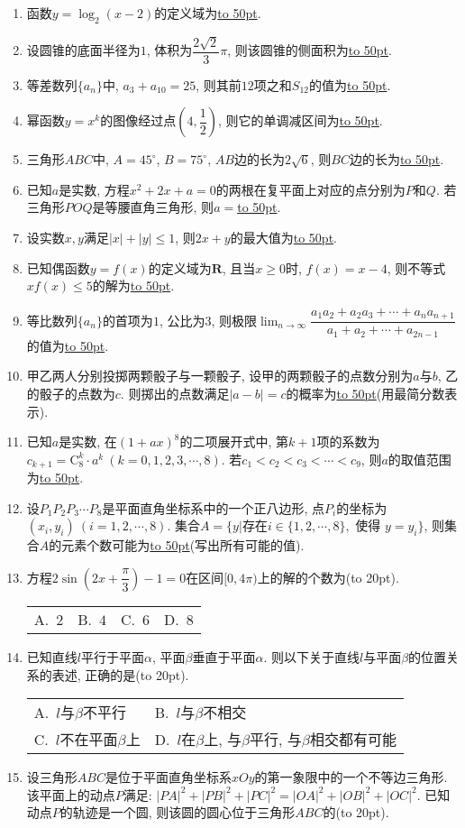 \documentclass[10pt,a4paper]{article}
\newcommand{\blank}[1]{\underline{\hbox to #1pt{}}}
\newcommand{\bracket}[1]{(\hbox to #1pt{})}
\newcommand{\twoch}[4]{\par\begin{tabular}{p{.46\textwidth}p{.46\textwidth}}
A.~#1& B.~#2\\
C.~#3& D.~#4
\end{tabular}}
\newcommand{\fourch}[4]{\par\begin{tabular}{p{.23\textwidth}p{.23\textwidth}p{.23\textwidth}p{.23\textwidth}}
A.~#1 &B.~#2& C.~#3& D.~#4
\end{tabular}}
\begin{document}
\begin{enumerate}[1.]
\item 函数$y=\log_2(x-2)$的定义域为\blank{50}.
\item 设圆锥的底面半径为$1$, 体积为$\dfrac{2\sqrt 2}3\pi$, 则该圆锥的侧面积为\blank{50}.
\item 等差数列$\{a_n\}$中, $a_3+a_{10}=25$, 则其前$12$项之和$S_{12}$的值为\blank{50}.
\item 幂函数$y=x^k$的图像经过点$(4,\dfrac 12)$, 则它的单调减区间为\blank{50}.
\item 三角形$ABC$中, $A=45^\circ$, $B=75^\circ$, $AB$边的长为$2\sqrt 6$, 则$BC$边的长为\blank{50}.
\item 已知$a$是实数, 方程$x^2+2x+a=0$的两根在复平面上对应的点分别为$P$和$Q$. 若三角形$POQ$是等腰直角三角形, 则$a=$\blank{50}.
\item 设实数$x,y$满足$|x|+|y|\le 1$, 则$2x+y$的最大值为\blank{50}.
\item 已知偶函数$y=f(x)$的定义域为$\mathbf{R}$, 且当$x\ge 0$时, $f(x)=x-4$, 则不等式$xf(x)\le 5$的解为\blank{50}.
\item 等比数列$\{a_n\}$的首项为$1$, 公比为$3$, 则极限$\lim_{n\to \infty}\dfrac{a_1a_2+a_2a_3+\cdots+a_na_{n+1}}{a_1+a_2+\cdots+a_{2n-1}}$的值为\blank{50}.
\item 甲乙两人分别投掷两颗骰子与一颗骰子, 设甲的两颗骰子的点数分别为$a$与$b$, 乙的骰子的点数为$c$. 则掷出的点数满足$|a-b|=c$的概率为\blank{50}(用最简分数表示).
\item 已知$a$是实数, 在$(1+ax)^8$的二项展开式中, 第$k+1$项的系数为$c_{k+1}=\mathrm{C}_8^k\cdot a^k \ (k=0,1,2,3,\cdots,8)$. 若$c_1<c_2<c_3<\cdots<c_9$, 则$a$的取值范围为\blank{50}.
\item 设$P_1P_2P_3\cdots P_8$是平面直角坐标系中的一个正八边形, 点$P_i$的坐标为$(x_i,y_i) \ (i=1,2,\cdots,8)$. 集合$A=\{y|\text{存在} i\in \{1,2,\cdots,8\},\text{ 使得 }y=y_i\}$, 则集合$A$的元素个数可能为\blank{50}(写出所有可能的值).
\item 方程$2\sin (2x+\dfrac{\pi}3)-1=0$在区间$[0,4\pi)$上的解的个数为\bracket{20}.
\fourch{$2$}{$4$}{$6$}{$8$}
\item 已知直线$l$平行于平面$\alpha$, 平面$\beta$垂直于平面$\alpha$. 则以下关于直线$l$与平面$\beta$的位置关系的表述, 正确的是\bracket{20}.
\twoch{$l$与$\beta$不平行}{$l$与$\beta$不相交
}{$l$不在平面$\beta$上}{$l$在$\beta$上, 与$\beta$平行, 与$\beta$相交都有可能}
\item 设三角形$ABC$是位于平面直角坐标系$xOy$的第一象限中的一个不等边三角形. 该平面上的动点$P$满足: $|PA|^2+|PB|^2+|PC|^2=|OA|^2+|OB|^2+|OC|^2$. 已知动点$P$的轨迹是一个圆, 则该圆的圆心位于三角形$ABC$的\bracket{20}.

\end{enumerate}
\end{document}
